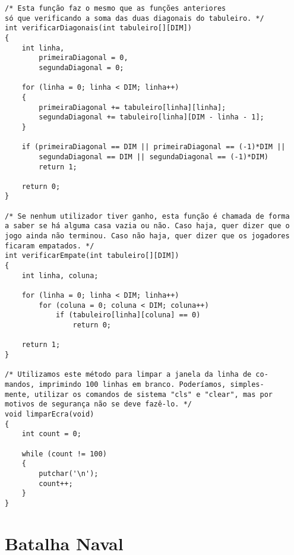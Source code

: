 \begin{lstlisting}
/* Esta função faz o mesmo que as funções anteriores
só que verificando a soma das duas diagonais do tabuleiro. */
int verificarDiagonais(int tabuleiro[][DIM])
{
	int linha,
		primeiraDiagonal = 0,
		segundaDiagonal = 0;

	for (linha = 0; linha < DIM; linha++)
	{
		primeiraDiagonal += tabuleiro[linha][linha];
		segundaDiagonal += tabuleiro[linha][DIM - linha - 1];
	}

	if (primeiraDiagonal == DIM || primeiraDiagonal == (-1)*DIM ||
		segundaDiagonal == DIM || segundaDiagonal == (-1)*DIM)
		return 1;

	return 0;
}

/* Se nenhum utilizador tiver ganho, esta função é chamada de forma
a saber se há alguma casa vazia ou não. Caso haja, quer dizer que o 
jogo ainda não terminou. Caso não haja, quer dizer que os jogadores
ficaram empatados. */
int verificarEmpate(int tabuleiro[][DIM])
{
	int linha, coluna;

	for (linha = 0; linha < DIM; linha++)
		for (coluna = 0; coluna < DIM; coluna++)
			if (tabuleiro[linha][coluna] == 0)
				return 0;

	return 1;
}

/* Utilizamos este método para limpar a janela da linha de co-
mandos, imprimindo 100 linhas em branco. Poderíamos, simples-
mente, utilizar os comandos de sistema "cls" e "clear", mas por
motivos de segurança não se deve fazê-lo. */
void limparEcra(void)
{
	int count = 0;

	while (count != 100)
	{
		putchar('\n');
		count++;
	}
}\end{lstlisting}

\section{Batalha Naval}
